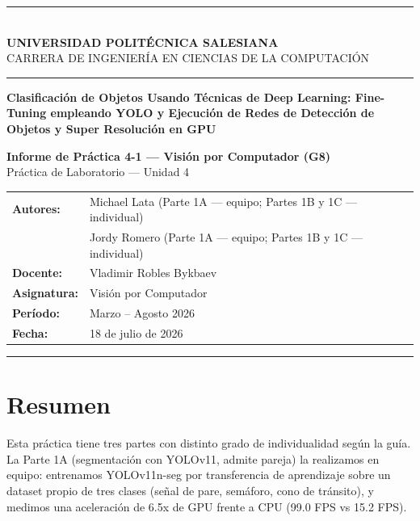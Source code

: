 \documentclass[12pt,a4paper]{article}
\begin{document}

\begin{titlepage}
  \centering
  \rule{\linewidth}{1.5pt}\\[0.4cm]
  {\large\bfseries UNIVERSIDAD POLITÉCNICA SALESIANA}\\[0.1cm]
  {\normalsize CARRERA DE INGENIERÍA EN CIENCIAS DE LA COMPUTACIÓN}\\[0.2cm]
  \rule{\linewidth}{0.8pt}

  \vspace{2cm}

  \parbox{0.85\textwidth}{\centering\LARGE\bfseries\color{salesiana}
    Clasificación de Objetos Usando Técnicas de Deep Learning: Fine-Tuning
    empleando YOLO y Ejecución de Redes de Detección de Objetos y
    Super Resolución en GPU
  }

  \vspace{1.5cm}

  {\large\bfseries Informe de Práctica 4-1 — Visión por Computador (G8)}\\[0.2cm]
  {\normalsize Práctica de Laboratorio — Unidad 4}

  \vspace{1.5cm}

  \begin{tabular}{ll}
    \textbf{Autores:}   & Michael Lata \quad\small(Parte 1A — equipo; Partes 1B y 1C — individual) \\[0.2cm]
                        & Jordy Romero \quad\small(Parte 1A — equipo; Partes 1B y 1C — individual) \\[0.3cm]
    \textbf{Docente:}   & Vladimir Robles Bykbaev \\[0.3cm]
    \textbf{Asignatura:}& Visión por Computador \\[0.3cm]
    \textbf{Período:}   & Marzo -- Agosto 2026 \\[0.3cm]
    \textbf{Fecha:}     & 18 de julio de 2026 \\
  \end{tabular}

  \vfill
  \rule{\linewidth}{1.5pt}
\end{titlepage}

\section*{Resumen}

Esta práctica tiene tres partes con distinto grado de individualidad según la guía. La Parte 1A (segmentación con YOLOv11, admite pareja) la realizamos en equipo: entrenamos YOLOv11n-seg por transferencia de aprendizaje sobre un dataset propio de tres clases (señal de pare, semáforo, cono de tránsito), y medimos una aceleración de 6.5x de GPU frente a CPU (99.0 FPS vs 15.2 FPS).
\end{document}
